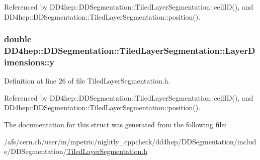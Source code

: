 Referenced by DD4hep::DDSegmentation::TiledLayerSegmentation::cellID(), and DD4hep::DDSegmentation::TiledLayerSegmentation::position().\hypertarget{struct_d_d4hep_1_1_d_d_segmentation_1_1_tiled_layer_segmentation_1_1_layer_dimensions_a11c49c068bf574008a598dd0fbd5df31}{
\subsubsection[{y}]{\setlength{\rightskip}{0pt plus 5cm}double {\bf DD4hep::DDSegmentation::TiledLayerSegmentation::LayerDimensions::y}}}
\label{struct_d_d4hep_1_1_d_d_segmentation_1_1_tiled_layer_segmentation_1_1_layer_dimensions_a11c49c068bf574008a598dd0fbd5df31}


Definition at line 26 of file TiledLayerSegmentation.h.

Referenced by DD4hep::DDSegmentation::TiledLayerSegmentation::cellID(), and DD4hep::DDSegmentation::TiledLayerSegmentation::position().

The documentation for this struct was generated from the following file:\begin{DoxyCompactItemize}
\item 
/afs/cern.ch/user/m/mpetric/nightly\_\-cppcheck/dd4hep/DDSegmentation/include/DDSegmentation/\hyperlink{_tiled_layer_segmentation_8h}{TiledLayerSegmentation.h}\end{DoxyCompactItemize}
